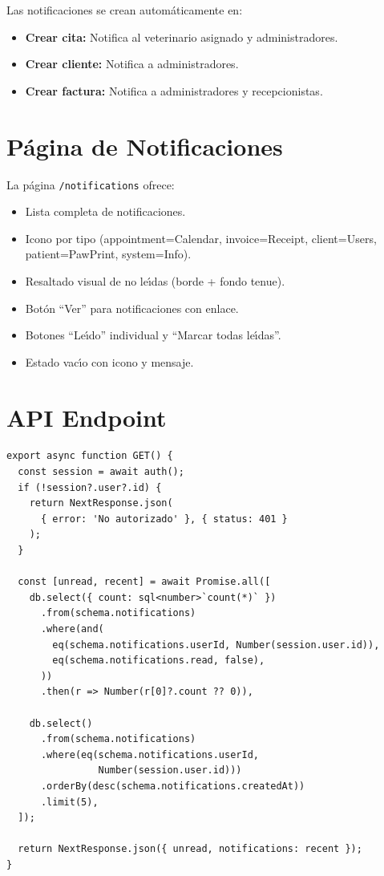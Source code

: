 Las notificaciones se crean autom\'aticamente en:

\begin{itemize}[leftmargin=*]
    \item \textbf{Crear cita:} Notifica al veterinario asignado y
          administradores.
    \item \textbf{Crear cliente:} Notifica a administradores.
    \item \textbf{Crear factura:} Notifica a administradores y
          recepcionistas.
\end{itemize}

\section{P\'agina de Notificaciones}

La p\'agina \texttt{/notifications} ofrece:

\begin{itemize}[leftmargin=*]
    \item Lista completa de notificaciones.
    \item Icono por tipo (appointment=Calendar, invoice=Receipt,
          client=Users, patient=PawPrint, system=Info).
    \item Resaltado visual de no le\'{\i}das (borde + fondo tenue).
    \item Bot\'on ``Ver'' para notificaciones con enlace.
    \item Botones ``Le\'{\i}do'' individual y ``Marcar todas le\'{\i}das''.
    \item Estado vac\'{\i}o con icono y mensaje.
\end{itemize}

\section{API Endpoint}

\begin{lstlisting}[style=typescript, caption=GET /api/notifications - Endpoint JSON]
export async function GET() {
  const session = await auth();
  if (!session?.user?.id) {
    return NextResponse.json(
      { error: 'No autorizado' }, { status: 401 }
    );
  }

  const [unread, recent] = await Promise.all([
    db.select({ count: sql<number>`count(*)` })
      .from(schema.notifications)
      .where(and(
        eq(schema.notifications.userId, Number(session.user.id)),
        eq(schema.notifications.read, false),
      ))
      .then(r => Number(r[0]?.count ?? 0)),

    db.select()
      .from(schema.notifications)
      .where(eq(schema.notifications.userId,
                Number(session.user.id)))
      .orderBy(desc(schema.notifications.createdAt))
      .limit(5),
  ]);

  return NextResponse.json({ unread, notifications: recent });
}
\end{lstlisting}

